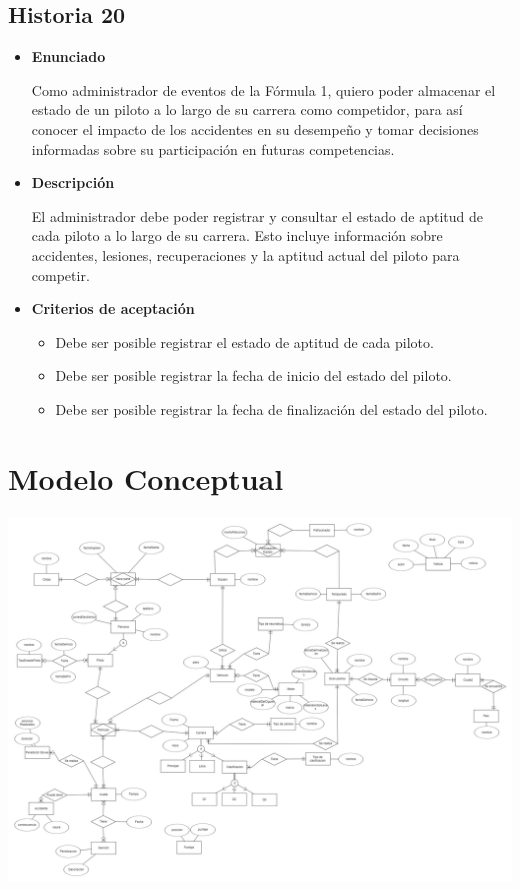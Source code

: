 \documentclass{article}
\begin{document}
	\subsection{Historia 20}
	\begin{itemize}
		
		\item \large{\textbf{Enunciado}}
		\begin{description}
Como administrador de eventos de la Fórmula 1, quiero poder almacenar el estado de un piloto a lo largo de su carrera como competidor, para así conocer el impacto de los accidentes en su desempeño y tomar decisiones informadas sobre su participación en futuras competencias.

		\end{description}
		
		\item \large{\textbf{Descripción}}
		\begin{description}
El administrador debe poder registrar y consultar el estado de aptitud de cada piloto a lo largo de su carrera. Esto incluye información sobre accidentes, lesiones, recuperaciones y la aptitud actual del piloto para competir.

		\end{description}
		
		\item \large{\textbf{Criterios de aceptación}}
		\begin{itemize}
			\item Debe ser posible registrar el estado de aptitud de cada piloto.
			\item Debe ser posible registrar la fecha de inicio del estado del piloto.
			\item Debe ser posible registrar la fecha de finalización del estado del piloto.
			
		\end{itemize}
		
	\end{itemize}
	

	
	\section{Modelo Conceptual}
	
	\includegraphics[width=\textwidth]{f1_conceptual}
	
\end{document}
